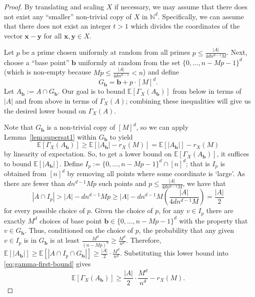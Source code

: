 \documentclass[12pt]{article}
\numberwithin{equation}{section}
\theoremstyle{definition}
\theoremstyle{remark}
\renewcommand{\vec}{\boldsymbol}
\begin{document}
\begin{proof}
By translating and scaling $X$ if necessary, we may assume that there does not exist any ``smaller'' non-trivial copy of $X$ in $\mathbb{N}^d$. Specifically, we can assume that there does not exist an integer $t>1$ which divides the coordinates of the vector $\vec{x}-\vec{y}$ for all $\vec{x},\vec{y}\in X$. 

Let $p$ be a prime chosen uniformly at random from all primes $p\leq \frac{|A|}{4dn^{d-1}M}$. Next, choose a ``base point'' $\vec{b}$ uniformly at random from the set $\{0,\dots,n-Mp-1\}^d$ (which is non-empty because $Mp\leq\frac{|A|}{4dn^{d-1}}<n$) and define
\[G_{\vec{b}} = \vec{b} + p\cdot[M]^d.\]
Let $A_{\vec{b}}:= A\cap G_{\vec{b}}$. Our goal is to bound $\mathbb{E}[\Gamma_X(A_{\vec{b}})]$ from below in terms of $|A|$ and from above in terms of $\Gamma_X(A)$; combining these inequalities will give us the desired lower bound on $\Gamma_X(A)$. 

Note that $G_{\vec{b}}$ is a non-trivial copy of $[M]^d$, so we can apply Lemma~\ref{lem:supersat1} within $G_{\vec{b}}$ to yield
\begin{equation}\label{eq:gamma-first-bound}
\mathbb{E}[\Gamma_X(A_{\vec{b}})] \geq \mathbb{E}[|A_{\vec{b}}| - r_X (M)] = \mathbb{E}[|A_{\vec{b}}|] - r_X (M)
\end{equation}
by linearity of expectation. So, to get a lower bound on $\mathbb{E}[\Gamma_X(A_{\vec{b}})]$, it suffices to bound $\mathbb{E}[|A_{\vec{b}}|]$. Define $I_p := \{0,\dots,n-Mp-1\}^d\cap [n]^d$; that is $I_p$ is obtained from $[n]^d$ by removing all points where some coordinate is `large'. As there are fewer than $dn^{d-1}Mp$ such points and $p\leq \frac{|A|}{4dn^{d-1}M}$, we have that
\[|A \cap I_p| > |A| - dn^{d-1}Mp \geq |A| - dn^{d-1}M\left(\frac{|A|}{4dn^{d-1}M}\right) = \frac{|A|}{2}\]
for every possible choice of $p$. Given the choice of $p$, for any $v\in I_p$ there are exactly $M^d$ choices of base point $\vec{b}\in \{0,\dots,n-Mp-1\}^d$ with the property that $v\in G_{\vec{b}}$. Thus, conditioned on the choice of $p$, the probability that any given $v\in I_p$ is in $G_{\vec{b}}$ is at least $\frac{M^d}{(n-Mp)^d}\geq \frac{M^d}{n^d}$. Therefore, $\mathbb{E}[|A_{\vec{b}}|] \geq \mathbb{E}[|A \cap I_p \cap G_{\vec{b}}|] \ge \frac{|A|}{2}\cdot\frac{M^d}{n^d}$. Substituting this lower bound into \eqref{eq:gamma-first-bound} gives
\begin{equation}\label{eq:exp-gamma-lb}
\mathbb{E}[\Gamma_X(A_{\vec{b}})] \geq \frac{|A|}{2}\cdot\frac{M^d}{n^d} - r_X (M).
\end{equation}


\end{proof}
\end{document}
